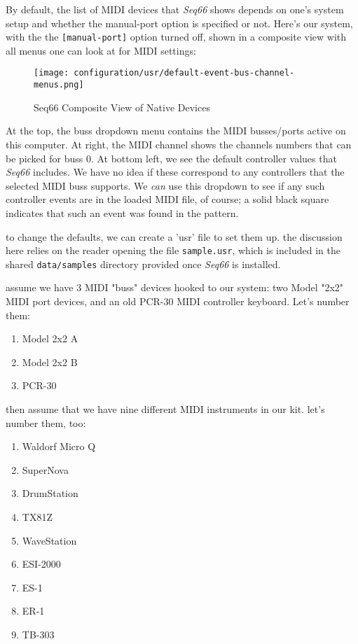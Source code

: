    By default, the list of MIDI devices that \textsl{Seq66} shows depends
   on one's system setup and whether the manual-port option is specified
   or not.  Here's our system, with the
   the \texttt{[manual-port]} option turned off, shown in a
   composite view with all menus one can look at for MIDI settings:

\begin{figure}[H]
   \centering 
   \texttt{[image: configuration/usr/default-event-bus-channel-menus.png]}
   \caption{Seq66 Composite View of Native Devices}
   \label{fig:default_event_bus_channel_menus}
\end{figure}

   At the top, the buss dropdown menu contains the MIDI busses/ports
   active on this computer.  At right, the MIDI channel shows
   the channels numbers that can be picked for buss 0.  At bottom left, we see
   the default controller values that \textsl{Seq66} includes.  We have
   no idea if these correspond to any controllers that the selected MIDI buss
   supports.  We \textsl{can} use this dropdown to see if any such controller
   events are in the loaded MIDI file, of course; a solid black square
   indicates that such an event was found in the pattern.

   to change the defaults, we can create a 'usr' file to set them up.
   the discussion here relies on the reader opening the file
   \texttt{sample.usr}, which is included in the shared \texttt{data/samples}
   directory provided once \textsl{Seq66} is installed.

   assume we have 3 MIDI "buss" devices hooked to our system:
   two Model "2x2" MIDI port devices, and an old PCR-30 MIDI controller
   keyboard.  Let's number them:

   \begin{enumerate}
      \item Model 2x2 A
      \item Model 2x2 B
      \item PCR-30
   \end{enumerate}

   then assume that we have nine different MIDI instruments in our kit.
   let's number them, too:

   \begin{enumerate}
      \item Waldorf Micro Q
      \item SuperNova
      \item DrumStation
      \item TX81Z
      \item WaveStation
      \item ESI-2000
      \item ES-1
      \item ER-1
      \item TB-303
   \end{enumerate}

